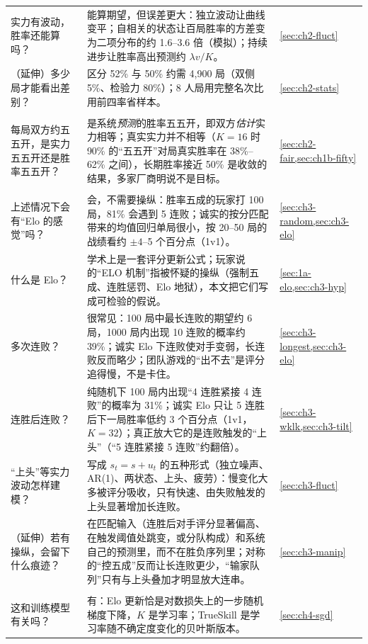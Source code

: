 {\begin{longtable}{@{}>{\raggedright\arraybackslash}p{3.5cm}>{\raggedright\arraybackslash}p{9.6cm}>{\raggedright\arraybackslash}p{2.0cm}@{}}
实力有波动，胜率还能算吗？ & 能算期望，但误差更大：独立波动让曲线变平；自相关的状态让百局胜率的方差变为二项分布的约 1.6–3.6 倍（模拟）；持续进步让胜率高出预测约 $\lambda v/K$。 & \cref{sec:ch2-fluct} \\
（延伸）多少局才能看出差别？ & 区分 52\% 与 50\% 约需 4,900 局（双侧 5\%、检验力 80\%）；8 人局用完整名次比用前四率省样本。 & \cref{sec:ch2-stats} \\
\midrule
\multicolumn{3}{@{}l}{\textbf{追问：每局“五五开”}}\\
每局双方约五五开，是实力五五开还是胜率五五开？ & 是系统\emph{预测}的胜率五五开，即双方\emph{估计}实力相等；真实实力并不相等（$K=16$ 时 90\% 的“五五开”对局真实胜率在 38\%–62\% 之间），长期胜率接近 50\% 是收敛的结果，多家厂商明说不是目标。 & \cref{sec:ch2-fair,sec:ch1b-fifty} \\
\midrule
\multicolumn{3}{@{}l}{\textbf{研究三：“Elo 感”}}\\
上述情况下会有“Elo 的感觉”吗？ & 会，不需要操纵：胜率五成的玩家打 100 局，81\% 会遇到 5 连败；诚实的按分匹配带来的均值回归单局很小，按 20–50 局的战绩看约 $\pm4$–5 个百分点（1v1）。 & \cref{sec:ch3-random,sec:ch3-elo} \\
什么是 Elo？ & 学术上是一套评分更新公式；玩家说的“ELO 机制”指被怀疑的操纵（强制五成、连胜惩罚、Elo 地狱），本文把它们写成可检验的假说。 & \cref{sec:1a-elo,sec:ch3-hyp} \\
多次连败？ & 很常见：100 局中最长连败的期望约 6 局，1000 局内出现 10 连败的概率约 39\%；诚实 Elo 下连败使对手变弱，长连败反而略少；团队游戏的“出不去”是评分追得慢，不是卡住。 & \cref{sec:ch3-longest,sec:ch3-elo} \\
连胜后连败？ & 纯随机下 100 局内出现“4 连胜紧接 4 连败”的概率为 31\%；诚实 Elo 只让 5 连胜后下一局胜率低约 3 个百分点（1v1，$K=32$）；真正放大它的是连败触发的“上头”（“5 连胜紧接 5 连败”约翻倍）。 & \cref{sec:ch3-wklk,sec:ch3-tilt} \\
“上头”等实力波动怎样建模？ & 写成 $s_t=s+u_t$ 的五种形式（独立噪声、AR(1)、两状态、上头、疲劳）：慢变化大多被评分吸收，只有快速、由失败触发的上头显著增加长连败。 & \cref{sec:ch3-fluct} \\
（延伸）若有操纵，会留下什么痕迹？ & 在匹配输入（连胜后对手评分显著偏高、在触发阈值处跳变，或分队构成）和系统自己的预测里，而不在胜负序列里；对称的“控五成”反而让长连败更少，“输家队列”只有与上头叠加才明显放大连串。 & \cref{sec:ch3-manip} \\
\midrule
\multicolumn{3}{@{}l}{\textbf{研究四：训练视角}}\\
这和训练模型有关吗？ & 有：Elo 更新恰是对数损失上的一步随机梯度下降，$K$ 是学习率；TrueSkill 是学习率随不确定度变化的贝叶斯版本。 & \cref{sec:ch4-sgd} \\

\end{longtable}}
